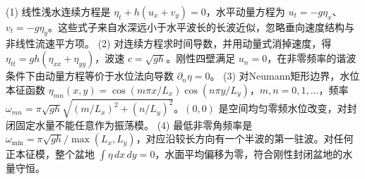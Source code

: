 (1) 线性浅水连续方程是 \(\eta_t+h(u_x+v_y)=0\)，水平动量方程为 \(u_t=-g\eta_x\)、\(v_t=-g\eta_y\)。这些式子来自水深远小于水平波长的长波近似，忽略垂向速度结构与非线性流速平方项。
(2) 对连续方程求时间导数，并用动量式消掉速度，得 \(\eta_{tt}=gh(\eta_{xx}+\eta_{yy})\)，波速 \(c=\sqrt{gh}\)。刚性四壁满足 \(u_n=0\)，在非零频率的谐波条件下由动量方程等价于水位法向导数 \(\partial_n\eta=0\)。
(3) 对Neumann矩形边界，水位本征函数 \(\eta_{mn}(x,y)=\cos(m\pi x/L_x)\cos(n\pi y/L_y)\)，\(m,n=0,1,\ldots\)，频率 \(\omega_{mn}=\pi\sqrt{gh}\sqrt{(m/L_x)^2+(n/L_y)^2}\)。\((0,0)\) 是空间均匀零频水位改变，对封闭固定水量不能任意作为振荡模。
(4) 最低非零角频率是 \(\omega_{\min}=\pi\sqrt{gh}/\max(L_x,L_y)\)，对应沿较长方向有一个半波的第一驻波。对任何正本征模，整个盆地 \(\int\eta\,dx\,dy=0\)，水面平均偏移为零，符合刚性封闭盆地的水量守恒。
